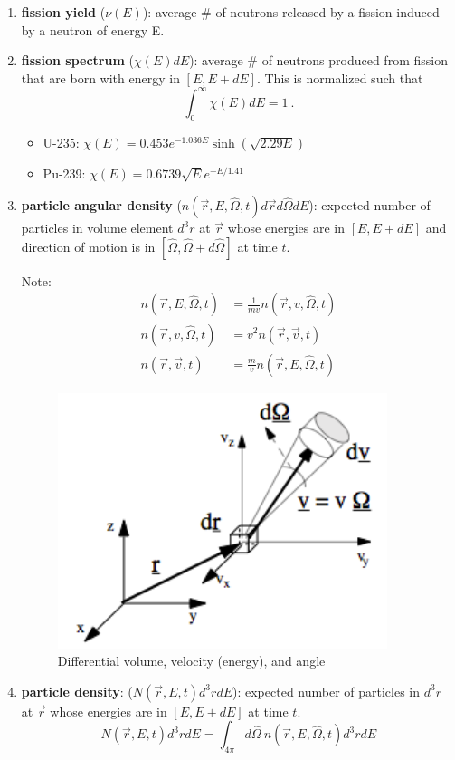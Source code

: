 \documentclass[12pt]{article}
\newcommand{\vOmega}{\ensuremath{\hat{\Omega}}}
\begin{document}
\begin{enumerate}
\item \textbf{fission yield} ($\nu(E)$): average \# of neutrons released by a fission induced by a neutron of energy E.

\item \textbf{fission spectrum} ($\chi(E)dE$): average \# of neutrons produced from fission that are born with energy in $[E, E + dE]$. This is normalized such that
\[\int_0^{\infty} \chi(E)dE =1\:.\]


\begin{itemize}
\item U-235: $\chi(E) = 0.453 e^{-1.036E} \sinh(\sqrt{2.29E})$
\item Pu-239: $\chi(E) = 0.6739 \sqrt{E} e^{-E / 1.41}$
\end{itemize}

\item \textbf{particle angular density} ($n(\vec{r}, E, \vOmega, t)d\vec{r} d\vOmega dE$): expected number of particles in volume element $d^3r$ at $\vec{r}$ whose energies are in $[E, E + dE]$ and direction of motion is in $[\vOmega, \vOmega + d\vOmega]$ at time $t$.

Note:
\begin{align*}
n(\vec{r}, E, \vOmega, t) &= \frac{1}{mv}n(\vec{r}, v, \vOmega, t) \\
n(\vec{r}, v, \vOmega, t) &= v^2 n(\vec{r}, \vec{v}, t) \\
n(\vec{r}, \vec{v}, t) &= \frac{m}{v}n(\vec{r}, E, \vOmega, t)
\end{align*}
\begin{figure}[h!]
    \begin{center}
    \includegraphics[keepaspectratio, width = 2.5 in]{differential-element}
    \end{center}
    \caption{Differential volume, velocity (energy), and angle}
    \label{fig:phase_space}
\end{figure}

\item \textbf{particle density}: ($N(\vec{r},E,t)d^3r dE$): expected number of particles in $d^3r$ at $\vec{r}$ whose energies are in $[E, E + dE]$ at time $t$.
\[N(\vec{r},E,t)d^3r dE = \int_{4\pi} d\vOmega\: n(\vec{r}, E, \vOmega, t)d^3r dE \]


\end{enumerate}
\end{document}
